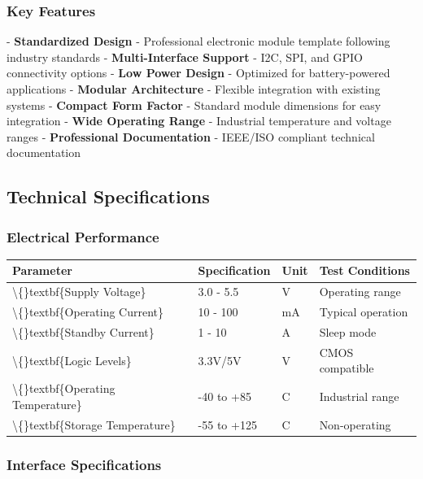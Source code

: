 \documentclass[11pt,a4paper]{article}
\begin{document}
\subsubsection{Key Features}

- \textbf{Standardized Design} - Professional electronic module template following industry standards
- \textbf{Multi-Interface Support} - I2C, SPI, and GPIO connectivity options
- \textbf{Low Power Design} - Optimized for battery-powered applications
- \textbf{Modular Architecture} - Flexible integration with existing systems
- \textbf{Compact Form Factor} - Standard module dimensions for easy integration
- \textbf{Wide Operating Range} - Industrial temperature and voltage ranges
- \textbf{Professional Documentation} - IEEE/ISO compliant technical documentation

\subsection{Technical Specifications}

\subsubsection{Electrical Performance}

\begin{table}[H]
\centering
\begin{tabular}{llll}
\toprule
Parameter & Specification & Unit & Test Conditions \\
\midrule
\textbackslash\{\}textbf\{Supply Voltage\} & 3.0 - 5.5 & V & Operating range \\
\textbackslash\{\}textbf\{Operating Current\} & 10 - 100 & mA & Typical operation \\
\textbackslash\{\}textbf\{Standby Current\} & 1 - 10 & \textmu{}A & Sleep mode \\
\textbackslash\{\}textbf\{Logic Levels\} & 3.3V/5V & V & CMOS compatible \\
\textbackslash\{\}textbf\{Operating Temperature\} & -40 to +85 & \textdegree{}C & Industrial range \\
\textbackslash\{\}textbf\{Storage Temperature\} & -55 to +125 & \textdegree{}C & Non-operating \\
\bottomrule
\end{tabular}
\end{table}


\subsubsection{Interface Specifications}
\end{document}
